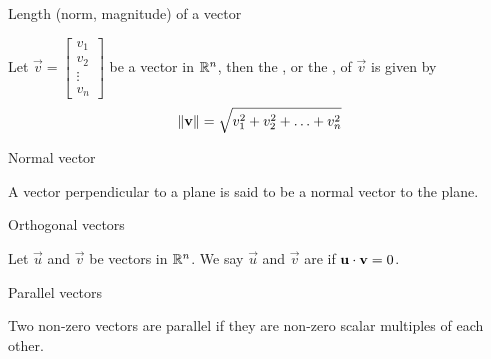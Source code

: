 \documentclass{ximera}
\begin{document}

Length (norm, magnitude) of a vector

\begin{expandable}
Let $\vec{v}=\begin{bmatrix}v_1\\ v_2\\ \vdots \\v_n\end{bmatrix}$ be a vector in $\mathbb{R}^n$, then the , or the , of $\vec{v}$ is given by
$$  \left\lVert\mathbf{v}\right\rVert=\sqrt{v_1^2+v_2^2+\ldots +v_n^2}$$
\end{expandable}

 
Normal vector

\begin{expandable}
    A vector perpendicular to a plane is said to be a normal vector to the plane.
\end{expandable}

 
Orthogonal vectors

\begin{expandable}
Let $\vec{u}$ and $\vec{v}$ be vectors in $\mathbb{R}^n$. We say $\vec{u}$ and $\vec{v}$ are  if $\mathbf{u}\cdot \mathbf{v}=0$.
\end{expandable}

 
Parallel vectors

\begin{expandable}
    Two non-zero vectors are parallel if they are non-zero scalar multiples of each other.
\end{expandable}
\end{document}
